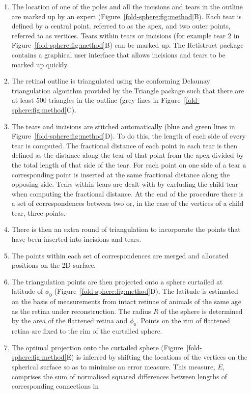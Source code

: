 \documentclass[10pt]{article}
\begin{document}
\begin{enumerate}
\item The location of one of the poles and all the incisions and tears
  in the outline are marked up by an expert
  (Figure~\ref{fold-sphere:fig:method}B). Each tear is defined by a
  central point, referred to as the apex, and two outer points,
  referred to as vertices.  Tears within tears or incisions (for
  example tear 2 in Figure~\ref{fold-sphere:fig:method}B) can be
  marked up. The Retistruct package contains a graphical user
  interface that allows incisions and tears to be marked up quickly.
\item The retinal outline is triangulated using the conforming
  Delaunay triangulation algorithm provided by the Triangle package
  \cite{Shew96tria} such that there are at least 500 triangles in
  the outline (grey lines in Figure~\ref{fold-sphere:fig:method}C).
\item The tears and incisions are stitched automatically (blue and
  green lines in Figure~\ref{fold-sphere:fig:method}D). To do this,
  the length of each side of every tear is computed. The fractional
  distance of each point in each tear is then defined as the distance
  along the tear of that point from the apex divided by the total
  length of that side of the tear. For each point on one side of a
  tear a corresponding point is inserted at the same fractional
  distance along the opposing side. Tears within tears are dealt with
  by excluding the child tear when computing the fractional
  distance. At the end of the procedure there is a set of
  correspondences between two or, in the case of the vertices of a
  child tear, three points.
\item There is then an extra round of triangulation to incorporate the
  points that have been inserted into incisions and tears.
\item The points within each set of correspondences are merged and
  allocated positions on the 2D surface.
\item The triangulation points are then projected onto a sphere
  curtailed at latitude of $\phi_0$
  (Figure~\ref{fold-sphere:fig:method}D). The latitude is estimated on
  the basis of measurements from intact retinae of animals of the same
  age as the retina under reconstruction. The radius $R$ of the sphere
  is determined by the area of the flattened retina and $\phi_0$.
  Points on the rim of flattened retina are fixed to the rim of the
  curtailed sphere.
\item The optimal projection onto the curtailed sphere
  (Figure~\ref{fold-sphere:fig:method}E) is inferred by shifting the
  locations of the vertices on the spherical surface so as to minimise
  an error measure. This measure, $E$, comprises the sum of normalised
  squared differences between lengths of corresponding connections in


\end{enumerate}
\end{document}
